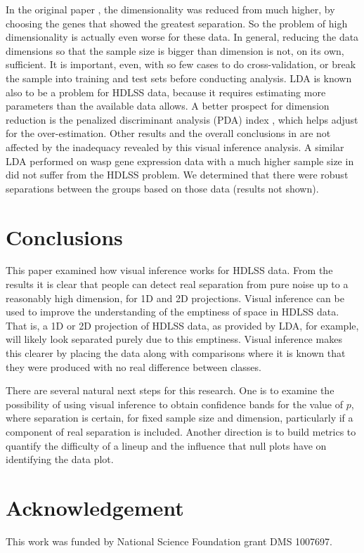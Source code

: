 In the original paper \citep{toth:2010}, the dimensionality was reduced from much higher, by choosing the genes that showed the greatest separation. So the problem of high dimensionality is actually even worse for these data. In general, reducing the data dimensions so that the sample size is bigger than dimension is not, on its own, sufficient. It is important, even, with so few cases to do cross-validation, or break the sample into training and test sets before conducting analysis. LDA is known also to be a problem for HDLSS data, because it requires estimating more parameters than the available data allows. A better prospect for dimension reduction is the penalized discriminant analysis (PDA) index \citep{lee:2009}, which helps adjust for the over-estimation. Other results and the overall conclusions in \cite{toth:2010} are not affected by the inadequacy revealed by this visual inference analysis. A similar LDA performed on wasp gene expression data with a much higher sample size in \cite{toth:2007} did not suffer from the HDLSS problem. We determined that there were robust separations between the groups based on those data (results not shown).

\section{Conclusions}

This paper examined how visual inference works for HDLSS data. From the results it is clear that people can detect real separation from pure noise  up to a reasonably high dimension, for 1D and 2D projections. Visual inference can be used to improve the understanding of the emptiness of space in HDLSS data. That is, a 1D or 2D projection of HDLSS data,  as provided by LDA, for example, will likely look separated purely due to this emptiness. Visual inference makes this clearer by placing the data along with comparisons where it is known that they were produced with no real difference between classes.

There are several natural next steps for this research. One is to examine the possibility of using visual inference to obtain confidence bands for the value of $p$, where separation is certain, for fixed sample size and dimension, particularly if a component of real separation is included. Another direction is to build metrics to quantify the difficulty of a lineup and the influence that null plots have on identifying the data plot. 

\section*{Acknowledgement}
%
This work was funded by National Science Foundation grant DMS 1007697.

